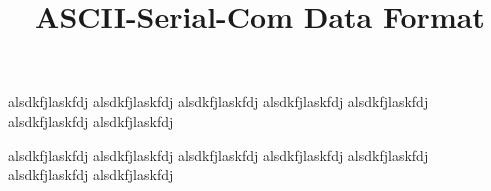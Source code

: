 \documentclass{customdocclass}
\title{ASCII-Serial-Com Data Format}
\begin{document}
alsdkfjlaskfdj
alsdkfjlaskfdj
alsdkfjlaskfdj
alsdkfjlaskfdj
alsdkfjlaskfdj
alsdkfjlaskfdj
alsdkfjlaskfdj

alsdkfjlaskfdj
alsdkfjlaskfdj
alsdkfjlaskfdj
alsdkfjlaskfdj
alsdkfjlaskfdj
alsdkfjlaskfdj
alsdkfjlaskfdj
\end{document}
